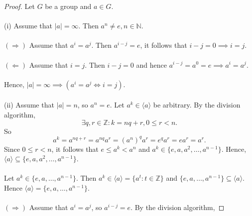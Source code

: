 \documentclass{article}
\newtheorem{theorem}{Theorem}[section]
\theoremstyle{definition}
\begin{document}
\noindent{}

\begin{proof}
    Let $G$ be a group and $a \in G$.
    \\ \\
    (i) Assume that $|a|=\infty$. Then $a^n \neq e, n \in\mathbb{N}$. 
    \\ \\
    $(\Rightarrow)$ Assume that $a^i = a^j$. Then $a^{i-j}=e$, it follows that $i-j=0 \implies i=j$.
    \\ \\
    $(\Leftarrow)$ Assume that $i=j$. Then $i-j=0$ and hence $a^{i-j}=a^0=e \implies a^i = a^j$.
    \\ \\
    Hence, $|a|=\infty \implies (a^i=a^j \iff i=j)$.
    \\ \\
    (ii) Assume that $|a|=n$, so $a^n = e$. Let $a^k \in \langle a \rangle$ be arbitrary. By the division algorithm,
    \begin{equation*}
        \exists q,r \in \mathbb{Z}: k=nq+r, 0\leq r <n.
    \end{equation*}
    So
    \begin{equation*}
        a^k = a^{nq+r} = a^{nq}a^r = (a^n)^qa^r = e^qa^r = ea^r = a^r.
    \end{equation*}
    Since $0 \leq r<n$, it follows that $e \leq a^k < a^n$ and
    $a^k \in \{e,a,a^2,\dots,a^{n-1}\}$. Hence, $\langle a \rangle \subseteq \{e,a,a^2,\dots,a^{n-1}\}$.
    \\ \\
    Let $a^k \in \{e,a,\dots,a^{n-1}\}$. Then $a^k \in \langle a \rangle = \{a^t: t \in \mathbb{Z}\}$ and $\{e,a,\dots,a^{n-1}\} \subseteq \langle a \rangle$. Hence $\langle a \rangle = \{e,a,\dots,a^{n-1}\}$.
    \\ \\
    $(\Rightarrow)$ Assume that $a^i=a^j$, so $a^{i-j}=e$. By the division algorithm, 

\end{proof}
\end{document}
